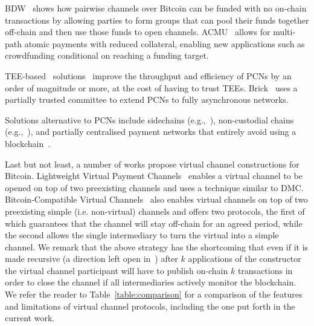   BDW~\cite{scalable-funding} shows how pairwise channels over Bitcoin can be   funded with no on-chain transactions by allowing parties to form groups that   can pool their funds together off-chain and then use those funds to open   channels. ACMU~\cite{10.1145/3319535.3345666} allows for multi-path atomic   payments with reduced collateral, enabling new applications such as   crowdfunding conditional on reaching a funding target.

  TEE-based~\cite{zhao2019sok}
solutions~\cite{teechan,10.1145/3341301.3359627,liao2021speedster,lee2020routee}
  improve the throughput and efficiency of PCNs by an order of magnitude or
  more, at the cost of having to trust TEEs. Brick~\cite{avarikioti2020brick}
  uses a partially trusted committee to extend PCNs to fully asynchronous
  networks.

  Solutions alternative to PCNs include 
side\-chains (e.g.,~\cite{BCDF+14,sidechains,KiaZin18}),
non-custodial chains (e.g.,~\cite{plasma,konstantopoulos2019plasma,plasma-lower-bounds,rollup}),
  and partially centralised payment networks that entirely avoid using a blockchain~\cite{DBLP:conf/trust/ArmknechtKMYZ15,stellar,silentwhispers,DBLP:conf/ndss/RoosMKG18}. 

  Last but not least, a number of works propose virtual channel constructions
  for Bitcoin. Lightweight Virtual Payment
  Channels~\cite{10.1007/978-3-030-65411-5_18} enables a virtual channel to be
  opened on top of two preexisting channels and uses a technique similar to DMC.
  Bitcoin-Compatible Virtual Channels~\cite{cryptoeprint:2020:554} also enables
  virtual channels on top of two preexisting simple (i.e. non-virtual) channels
  and offers two protocols, the first of which guarantees that the channel will
  stay off-chain for an agreed period, while the second allows the single intermediary
  to turn the virtual into a simple channel. 
  We remark that the above strategy has the shortcoming that even if it is made
  recursive (a direction left open in~\cite{cryptoeprint:2020:554}) after $k$
  applications of the constructor the virtual channel participant will have to
  publish on-chain $k$ transactions in order to close the channel if all
  intermediaries actively monitor the blockchain.
  We refer the reader to Table~\ref{table:comparison} for a comparison of the
  features and limitations of virtual channel protocols, including the one put
  forth in the current work.

